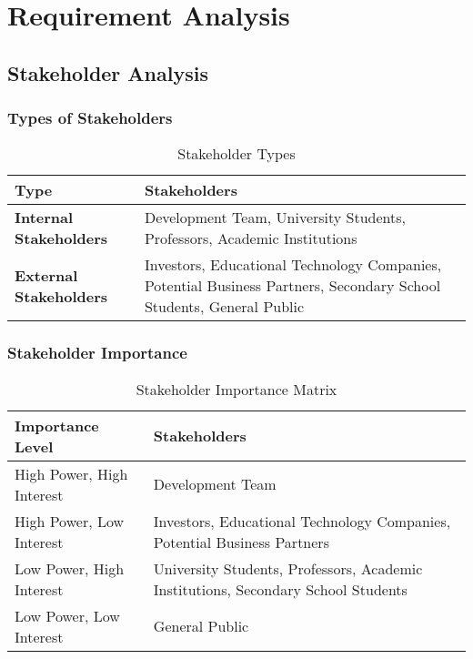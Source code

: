 \chapter{Requirement Analysis}
\label{chap:requirement-analysis}

\section{Stakeholder Analysis}
\label{section:stakeholder-analysis}
% 

\subsection{Types of Stakeholders}

\begin{table}[ht]
    \centering
    \begin{tabularx}{\linewidth}{lX}
        \hline
        \textbf{Type} & \textbf{Stakeholders} \\ 
        \hline
        \textbf{Internal Stakeholders} & Development Team, University Students, Professors, Academic Institutions \\ 
        \textbf{External Stakeholders} & Investors, Educational Technology Companies, Potential Business Partners, Secondary School Students, General Public \\ 
        \hline
    \end{tabularx}
    \caption{Stakeholder Types}
    \label{tab:stakeholder-types}
\end{table}

\subsection{Stakeholder Importance}

\begin{table}[ht]
    \centering
    \begin{tabularx}{\linewidth}{lX}
        \hline
        \textbf{Importance Level} & \textbf{Stakeholders} \\ 
        \hline
        High Power, High Interest & Development Team \\ 
        High Power, Low Interest & Investors, Educational Technology Companies, Potential Business Partners \\ 
        Low Power, High Interest & University Students, Professors, Academic Institutions, Secondary School Students \\ 
        Low Power, Low Interest & General Public \\ 
        \hline
    \end{tabularx}
    \caption{Stakeholder Importance Matrix}
    \label{tab:stakeholder-importance}
\end{table}


